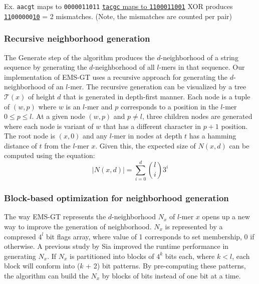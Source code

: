 	{\small Ex.	\texttt{aacgt} maps to \texttt{0000011011} \newline
		\vspace*{2pt}\hspace*{53pt} \underline{\texttt{tacgc} maps to \texttt{1100011001}} \newline
		\hspace*{55pt}	XOR produces \texttt{\uline{11}000000\uline{10}} = 2 mismatches.} \newline
		\hspace*{53pt} (Note, the mismatches are counted per pair)


	\subsubsection{Recursive neighborhood generation}
	The Generate step of the algorithm produces the $d$-neighborhood of a string sequence by generating the $d$-neighborhood of all $l$-mers in that sequence. Our implementation of EMS-GT uses a recursive approach for generating the $d$-neighborhood of an $l$-mer. The recursive generation can be visualized by a tree $\mathcal{T}(x)$ of height $d$ that is generated in depth-first manner. Each node is a tuple of $(w, p)$ where $w$ is an $l$-mer and $p$ corresponds to a position in the $l$-mer $0 \leq p \leq l$. At a given node $(w, p)$ and $p \neq l$, three children nodes are generated where each node is variant of $w$ that has a different character in $p + 1$ position. The root node is $(x, 0)$ and any $l$-mer in nodes at depth $t$ has a hamming distance of $t$ from the $l$-mer $x$. Given this, the expected size of $N(x, d)$ can be computed using the equation: \newline
	\begin{equation}
		|N(x,d)| = \sum_{i=0}^d \binom{l}{i} 3^{i}
	\end{equation}

	

	\subsubsection{Block-based optimization for neighborhood generation}
	The way EMS-GT represents the $d$-neighborhood $N_x$ of $l$-mer $x$ opens up a new way to improve the generation of neighborhood. $N_x$ is represented by a compresed $4^l$ bit flags array, where value of 1 corresponds to set membership, 0 if otherwise.  A previous study by Sia \cite{sia2015} improved the runtime performance in generating $N_x$. If $N_x$ is partitioned into blocks of $4^k$ bits each, where $k < l$, each block will conform into ($k$ + 2) bit patterns. By pre-computing these patterns, the algorithm can build the $N_x$ by blocks of bits instead of one bit at a time.

